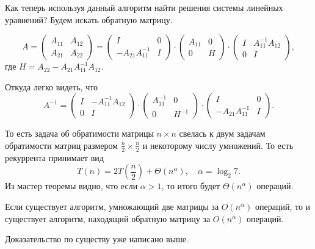 Как теперь используя данный алгоритм найти решения системы линейных уравнений? Будем искать обратную матрицу.

\[
	A =
	\left(
	\begin{array}{cc}
			A_{11} & A_{12} \\
			A_{21} & A_{22}
		\end{array}
	\right)=
	\left(
	\begin{array}{cc}
			I                  & 0 \\
			-A_{21}A_{11}^{-1} & I
		\end{array}
	\right)\cdot
	\left(
	\begin{array}{cc}
			A_{11} & 0 \\
			0      & H
		\end{array}
	\right)\cdot
	\left(
	\begin{array}{cc}
			I & A_{11}^{-1}A_{12} \\
			0 & I
		\end{array}
	\right),
\]
где $H = A_{22}-A_{21}A_{11}^{-1}A_{12}$.

Откуда легко видеть, что
\[
	A^{-1} =
	\left(
	\begin{array}{cc}
			I & -A_{11}^{-1}A_{12} \\
			0 & I
		\end{array}
	\right)\cdot
	\left(
	\begin{array}{cc}
			A_{11}^{-1} & 0      \\
			0           & H^{-1}
		\end{array}
	\right)\cdot
	\left(
	\begin{array}{cc}
			I                  & 0 \\
			-A_{21}A_{11}^{-1} & I
		\end{array}
	\right).
\]

То есть задача об обратимости матрицы $n\times n$ свелась к двум задачам обратимости матриц размером
$\frac{n}{2}\times \frac{n}{2}$ и некоторому числу умножений. То есть рекуррента принимает вид
\[
	T(n)=2T\left(\dfrac{n}{2}\right)+\Theta(n^{\alpha}),\quad \alpha=\log_{2}7.
\]
Из мастер теоремы видно, что если $\alpha>1$, то итого будет $\Theta(n^{\alpha})$ операций.

\begin{claim}
	Если существует алгоритм, умножающий две матрицы за $O(n^{\alpha})$ операций, то
	и существует алгоритм, находящий обратную матрицу за $O(n^{\alpha})$ операций.

	Доказательство по существу уже написано выше.
\end{claim}